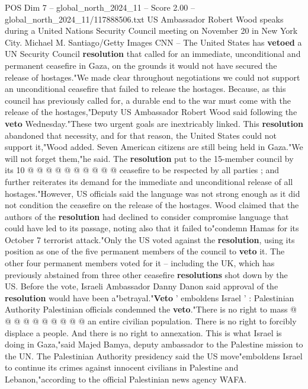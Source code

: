 \begin{textsample}{POS Dim 7 – global\_north\_2024\_11 – Score 2.00 – global\_north\_2024\_11/117888506.txt}  \label{ex:f7_pos_199}
US Ambassador Robert Wood speaks during a United Nations Security Council meeting on November 20 in New York City.
Michael M.
Santiago/Getty Images CNN -- The United States has \textbf{vetoed} a UN Security Council \textbf{resolution} that called for an immediate, unconditional and permanent ceasefire in Gaza, on the grounds it would not have secured the release of hostages."We made clear throughout negotiations we could not support an unconditional ceasefire that failed to release the hostages.
Because, as this council has previously called for, a durable end to the war must come with the release of the hostages,"Deputy US Ambassador Robert Wood said following the \textbf{veto} Wednesday."These two urgent goals are inextricably linked.
This \textbf{resolution} abandoned that necessity, and for that reason, the United States could not support it,"Wood added.
Seven American citizens are still being held in Gaza."We will not forget them,"he said.
The \textbf{resolution} put to the 15-member council by its 10 @ @ @ @ @ @ @ @ @ @ ceasefire to be respected by all parties ; and further reiterates its demand for the immediate and unconditional release of all hostages."However, US officials said the language was not strong enough as it did not condition the ceasefire on the release of the hostages.
Wood claimed that the authors of the \textbf{resolution} had declined to consider compromise language that could have led to its passage, noting also that it failed to"condemn Hamas for its October 7 terrorist attack."Only the US voted against the \textbf{resolution}, using its position as one of the five permanent members of the council to \textbf{veto} it.
The other four permanent members voted for it -- including the UK, which has previously abstained from three other ceasefire \textbf{resolutions} shot down by the US.
Before the vote, Israeli Ambassador Danny Danon said approval of the \textbf{resolution} would have been a"betrayal."\textbf{Veto} ' emboldens Israel ' : Palestinian Authority Palestinian officials condemned the \textbf{veto}."There is no right to mass @ @ @ @ @ @ @ @ @ @ an entire civilian population.
There is no right to forcibly displace a people.
And there is no right to annexation.
This is what Israel is doing in Gaza,"said Majed Bamya, deputy ambassador to the Palestine mission to the UN.
The Palestinian Authority presidency said the US move"emboldens Israel to continue its crimes against innocent civilians in Palestine and Lebanon,"according to the official Palestinian news agency WAFA.

\end{textsample}
